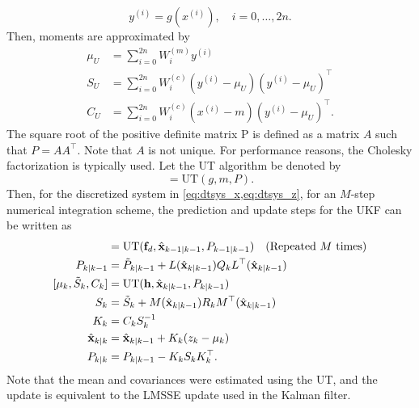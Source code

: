 \documentclass[../zhang_thesis.tex]{subfiles}
\begin{document}
\begin{equation}
    y^{(i)} = g(x^{(i)}), \quad i=0,\dots,2n. \label{eq:ut3}
\end{equation}
Then, moments are approximated by
\begin{align}
    \mu_U & = \sum_{i=0}^{2n} W_i^{(m)} y^{(i)} \\
    S_U & = \sum_{i=0}^{2n} W_i^{(c)} ( y^{(i)} - \mu_U ) ( y^{(i)} - \mu_U )^\top \\
    C_U & = \sum_{i=0}^{2n} W_i^{(c)} ( x^{(i)} - m ) ( y^{(i)} - \mu_U )^\top. \label{eq:ut4}
\end{align}
The square root of the positive definite matrix P is defined as a matrix $A$ such that $P=AA^\top$. Note that $A$ is not unique. For performance reasons, the Cholesky factorization is typically used. Let the UT algorithm be denoted by
\begin{equation}
    [\mu_U,S_U,C_U] = \mathrm{UT}(g,m,P).
\end{equation}
Then, for the discretized system in \cref{eq:dtsys_x,eq:dtsys_z}, for an $M$-step numerical integration scheme, the prediction and update steps for the UKF can be written as
\begin{align}
    [\hat{\vx}_{k|k-1},\tilde{P}_{k|k-1}] & = \mathrm{UT}(\vf_d,\hat{\vx}_{k-1|k-1},P_{k-1|k-1}) \quad \text{(Repeated $M$ times)} \label{eq:ukfp1} \\
	P_{k|k-1} & = \tilde{P}_{k|k-1} + L(\hat{\vx}_{k|k-1}) Q_k L^\top(\hat{\vx}_{k|k-1})\\
	[\mu_k,\tilde{S}_k,C_k] & = \mathrm{UT}(\mathbf{h},\hat{\vx}_{k|k-1},P_{k|k-1}) \label{eq:ukfu1} \\
    S_k & = \tilde{S}_k + M(\hat{\vx}_{k|k-1}) R_k M^\top(\hat{\vx}_{k|k-1}) \\
    K_k & = C_k S_k^{-1} \\
    \hat{\vx}_{k|k} & = \hat{\vx}_{k|k-1}+ K_k (z_k-\mu_k) \\
	P_{k|k} & = P_{k|k-1}- K_k S_k K_k^\top. \label{eq:ukful}
\end{align}
Note that the mean and covariances were estimated using the UT, and the update is equivalent to the LMSSE update used in the Kalman filter.
\end{document}
